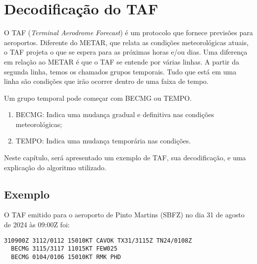\chapter{Decodificação do TAF}

O TAF (\textit{Terminal Aerodrome Forecast}) é um protocolo que fornece
previsões para aeroportos. Diferente
do METAR, que relata as condições meteorológicas atuais, o TAF projeta o que se
espera para as próximas horas e/ou dias. Uma diferença em relação ao METAR é que o 
TAF se entende por várias linhas.
A partir da segunda linha, temos os chamados grupos temporais. Tudo que está em uma linha
são condições que irão ocorrer dentro de uma faixa de tempo. 

Um grupo temporal pode começar com BECMG ou TEMPO.

\begin{enumerate}
\item BECMG: Indica uma mudança gradual e definitiva nas condições meteorológicas;
\item TEMPO: Indica uma mudança temporária nas condições.
\end{enumerate}


Neste capítulo, será apresentado um exemplo de TAF, sua decodificação,
e uma explicação do algoritmo utilizado.

\section{Exemplo}
O TAF emitido para o aeroporto de Pinto Martins (SBFZ) no dia 31 de agosto 
de 2024 às 09:00Z foi:

\begin{verbatim}
310900Z 3112/0112 15010KT CAVOK TX31/3115Z TN24/0108Z 
  BECMG 3115/3117 11015KT FEW025 
  BECMG 0104/0106 15010KT RMK PHD
\end{verbatim}

